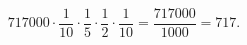 \[717000\cdot\dfrac1{10}\cdot\dfrac15\cdot\dfrac12\cdot\dfrac1{10}=\dfrac{717000}{1000}=\boxed{717}.\]
